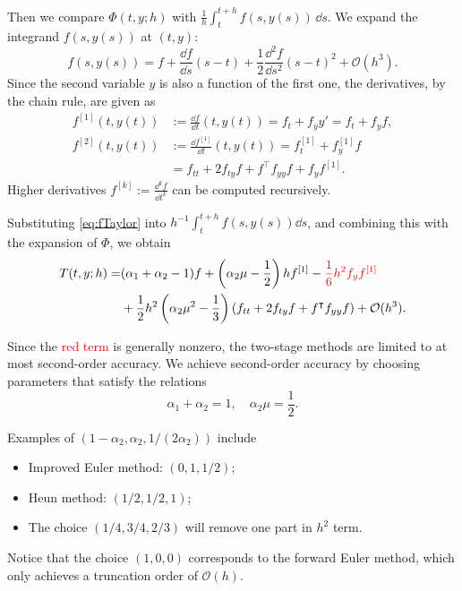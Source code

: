 \documentclass[10pt]{amsart}
\begin{document}
Then we compare $\Phi(t, y; h)$ with $\frac{1}{h} \int_{t}^{t+h} f(s, y(s)) \, \dd s$. We expand the integrand \( f(s, y(s)) \) at \((t, y)\):  
\begin{equation}\label{eq:fTaylor}  
f(s, y(s)) = f + \frac{\dd f}{\dd s}(s - t) + \frac{1}{2} \frac{\dd^2 f}{\dd s^2}(s - t)^2 + \mathcal{O}(h^3).  
\end{equation}  
Since the second variable \( y \) is also a function of the first one, the derivatives, by the chain rule, are given as  
\begin{align*}  
f^{[1]}(t, y(t)) &:= \frac{\dd f}{\dd t}(t, y(t)) = f_t + f_y y' = f_t + f_y f, \\  
f^{[2]}(t, y(t)) &:= \frac{\dd f^{[1]}}{\dd t}(t, y(t)) = f_t^{[1]} + f_y^{[1]} f \\  
&= f_{tt} + 2 f_{ty} f + f^{\intercal} f_{yy} f + f_y f^{[1]}.  
\end{align*}  
Higher derivatives \( f^{[k]} := \frac{\dd^k f}{\dd t^k} \) can be computed recursively.  

Substituting \eqref{eq:fTaylor} into \( h^{-1} \int_{t}^{t+h} f(s, y(s)) \dd s \), and combining this with the expansion of \( \Phi \), we obtain  
\begin{align*}  
T(t, y; h) = & (\alpha_1 + \alpha_2 - 1) f + \left( \alpha_2 \mu - \frac{1}{2} \right) h f^{[1]} - \color{red}{\frac{1}{6} h^2 f_y f^{[1]}} \\  
& + \frac{1}{2} h^2 \left( \alpha_2 \mu^2 - \frac{1}{3} \right) (f_{tt} + 2 f_{ty} f + f^{\intercal} f_{yy} f) + \mathcal{O}(h^3).  
\end{align*}  

Since the \textcolor{red}{red term} is generally nonzero, the two-stage methods are limited to at most second-order accuracy. We achieve second-order accuracy by choosing parameters that satisfy the relations  
\[
\alpha_1 + \alpha_2 = 1, \quad \alpha_2 \mu = \frac{1}{2}.
\]  

Examples of $(1- \alpha_2, \alpha_2, 1/(2\alpha_2))$ include
\begin{itemize}
 \item Improved Euler method: $(0, 1, 1/2)$;
 \item Heun method: $(1/2, 1/2, 1)$;
 \item The choice $(1/4, 3/4, 2/3)$ will remove one part in $h^2$ term.
\end{itemize}
Notice that the choice \((1, 0, 0)\) corresponds to the forward Euler method, which only achieves a truncation order of \( \mathcal{O}(h) \).  
\end{document}
